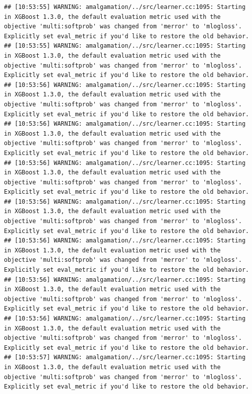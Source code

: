 \documentclass[
]{scrbook}
\begin{document}
\begin{verbatim}
## [10:53:55] WARNING: amalgamation/../src/learner.cc:1095: Starting in XGBoost 1.3.0, the default evaluation metric used with the objective 'multi:softprob' was changed from 'merror' to 'mlogloss'. Explicitly set eval_metric if you'd like to restore the old behavior.
## [10:53:55] WARNING: amalgamation/../src/learner.cc:1095: Starting in XGBoost 1.3.0, the default evaluation metric used with the objective 'multi:softprob' was changed from 'merror' to 'mlogloss'. Explicitly set eval_metric if you'd like to restore the old behavior.
## [10:53:56] WARNING: amalgamation/../src/learner.cc:1095: Starting in XGBoost 1.3.0, the default evaluation metric used with the objective 'multi:softprob' was changed from 'merror' to 'mlogloss'. Explicitly set eval_metric if you'd like to restore the old behavior.
## [10:53:56] WARNING: amalgamation/../src/learner.cc:1095: Starting in XGBoost 1.3.0, the default evaluation metric used with the objective 'multi:softprob' was changed from 'merror' to 'mlogloss'. Explicitly set eval_metric if you'd like to restore the old behavior.
## [10:53:56] WARNING: amalgamation/../src/learner.cc:1095: Starting in XGBoost 1.3.0, the default evaluation metric used with the objective 'multi:softprob' was changed from 'merror' to 'mlogloss'. Explicitly set eval_metric if you'd like to restore the old behavior.
## [10:53:56] WARNING: amalgamation/../src/learner.cc:1095: Starting in XGBoost 1.3.0, the default evaluation metric used with the objective 'multi:softprob' was changed from 'merror' to 'mlogloss'. Explicitly set eval_metric if you'd like to restore the old behavior.
## [10:53:56] WARNING: amalgamation/../src/learner.cc:1095: Starting in XGBoost 1.3.0, the default evaluation metric used with the objective 'multi:softprob' was changed from 'merror' to 'mlogloss'. Explicitly set eval_metric if you'd like to restore the old behavior.
## [10:53:56] WARNING: amalgamation/../src/learner.cc:1095: Starting in XGBoost 1.3.0, the default evaluation metric used with the objective 'multi:softprob' was changed from 'merror' to 'mlogloss'. Explicitly set eval_metric if you'd like to restore the old behavior.
## [10:53:56] WARNING: amalgamation/../src/learner.cc:1095: Starting in XGBoost 1.3.0, the default evaluation metric used with the objective 'multi:softprob' was changed from 'merror' to 'mlogloss'. Explicitly set eval_metric if you'd like to restore the old behavior.
## [10:53:57] WARNING: amalgamation/../src/learner.cc:1095: Starting in XGBoost 1.3.0, the default evaluation metric used with the objective 'multi:softprob' was changed from 'merror' to 'mlogloss'. Explicitly set eval_metric if you'd like to restore the old behavior.

\end{verbatim}
\end{document}
